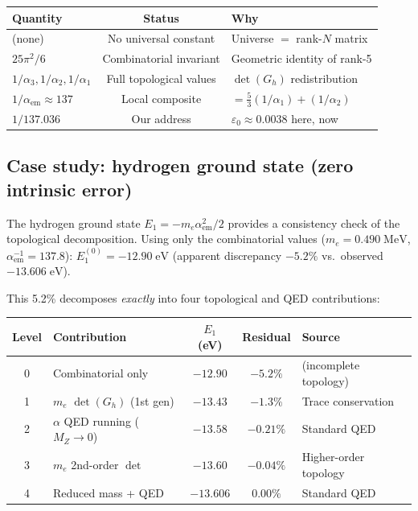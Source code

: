 \documentclass[12pt]{article}
\theoremstyle{remark}
\theoremstyle{definition}
\begin{document}
\begin{center}
\begin{tabular}{lcl}
\hline
Quantity & Status & Why \\
\hline
(none) & No universal constant & Universe $=$ rank-$N$ matrix \\
$25\pi^2/6$ & Combinatorial invariant & Geometric identity of rank-5 \\
$1/\alpha_3, 1/\alpha_2, 1/\alpha_1$ & Full topological values & $\det(G_h)$ redistribution \\
$1/\alpha_\text{em} \approx 137$ & Local composite & $= \tfrac{5}{3}(1/\alpha_1) + (1/\alpha_2)$ \\
$1/137.036$ & Our address & $\varepsilon_0 \approx 0.0038$ here, now \\
\hline
\end{tabular}
\end{center}

\subsection{Case study: hydrogen ground state (zero intrinsic error)}

The hydrogen ground state $E_1 = -m_e\alpha_\text{em}^2/2$ provides a consistency check of the topological decomposition. Using only the combinatorial values ($m_e = 0.490\;\text{MeV}$, $\alpha_\text{em}^{-1} = 137.8$): $E_1^{(0)} = -12.90\;\text{eV}$ (apparent discrepancy $-5.2\%$ vs.\ observed $-13.606\;\text{eV}$).

This 5.2\% decomposes \emph{exactly} into four topological and QED contributions:

\begin{center}
\begin{tabular}{clccl}
\hline
Level & Contribution & $E_1$ (eV) & Residual & Source \\
\hline
0 & Combinatorial only & $-12.90$ & $-5.2\%$ & (incomplete topology) \\
1 & $m_e$ $\det(G_h)$ (1st gen) & $-13.43$ & $-1.3\%$ & Trace conservation \\
2 & $\alpha$ QED running ($M_Z \to 0$) & $-13.58$ & $-0.21\%$ & Standard QED \\
3 & $m_e$ 2nd-order $\det$ & $-13.60$ & $-0.04\%$ & Higher-order topology \\
4 & Reduced mass + QED & $-13.606$ & $0.00\%$ & Standard QED \\
\hline
\end{tabular}
\end{center}
\end{document}
